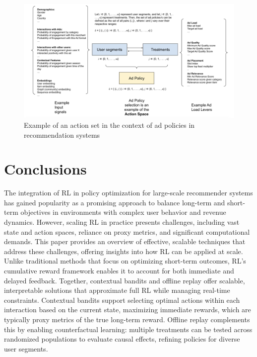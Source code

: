 \documentclass[final]{anthology-ch}         %
\begin{document}

\begin{figure}[ht]
    \centering
    \includegraphics[width=\textwidth]{detailed_ad_policy.png}
    \caption{Example of an action set in the context of ad policies in recommendation systems}
    \label{fig:detailed_ad_policy}
\end{figure}

\section{Conclusions}

The integration of RL in policy optimization for large-scale recommender systems has gained popularity as a promising approach to balance long-term and short-term objectives in environments with complex user behavior and revenue dynamics. However, scaling RL in practice presents challenges, including vast state and action spaces, reliance on proxy metrics, and significant computational demands. This paper provides an overview of effective, scalable techniques that address these challenges, offering insights into how RL can be applied at scale.
Unlike traditional methods that focus on optimizing short-term outcomes, RL’s cumulative reward framework enables it to account for both immediate and delayed feedback. Together, contextual bandits and offline replay offer scalable, interpretable solutions that approximate full RL while managing real-time constraints. Contextual bandits support selecting optimal actions within each interaction based on the current state, maximizing immediate rewards, which are typically proxy metrics of the true long-term reward. Offline replay complements this by enabling counterfactual learning: multiple treatments can be tested across randomized populations to evaluate causal effects, refining policies for diverse user segments.
\end{document}

